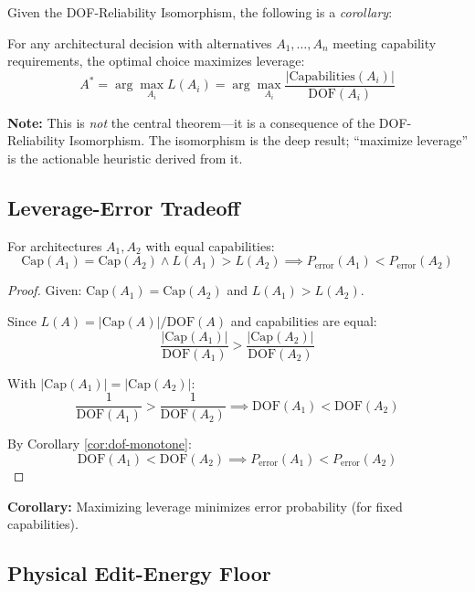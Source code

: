Given the DOF-Reliability Isomorphism, the following is a \emph{corollary}:

\begin{theorem}\label{thm:leverage-max}
For any architectural decision with alternatives $A_1, \ldots, A_n$ meeting capability requirements, the optimal choice maximizes leverage:
\[
A^* = \arg\max_{A_i} L(A_i) = \arg\max_{A_i} \frac{|\text{Capabilities}(A_i)|}{\text{DOF}(A_i)}
\]
\end{theorem}

\textbf{Note:} This is \emph{not} the central theorem---it is a consequence of the DOF-Reliability Isomorphism. The isomorphism is the deep result; ``maximize leverage'' is the actionable heuristic derived from it.

\subsection{Leverage-Error Tradeoff}

\begin{theorem}\label{thm:leverage-error}
For architectures $A_1, A_2$ with equal capabilities:
\[
\text{Cap}(A_1) = \text{Cap}(A_2) \wedge L(A_1) > L(A_2) \implies P_{\text{error}}(A_1) < P_{\text{error}}(A_2)
\]
\end{theorem}

\begin{proof}
Given: $\text{Cap}(A_1) = \text{Cap}(A_2)$ and $L(A_1) > L(A_2)$.

Since $L(A) = |\text{Cap}(A)|/\text{DOF}(A)$ and capabilities are equal:
\[
\frac{|\text{Cap}(A_1)|}{\text{DOF}(A_1)} > \frac{|\text{Cap}(A_2)|}{\text{DOF}(A_2)}
\]

With $|\text{Cap}(A_1)| = |\text{Cap}(A_2)|$:
\[
\frac{1}{\text{DOF}(A_1)} > \frac{1}{\text{DOF}(A_2)} \implies \text{DOF}(A_1) < \text{DOF}(A_2)
\]

By Corollary \ref{cor:dof-monotone}:
\[
\text{DOF}(A_1) < \text{DOF}(A_2) \implies P_{\text{error}}(A_1) < P_{\text{error}}(A_2)
\]
\end{proof}

\textbf{Corollary:} Maximizing leverage minimizes error probability (for fixed capabilities).

\subsection{Physical Edit-Energy Floor}

